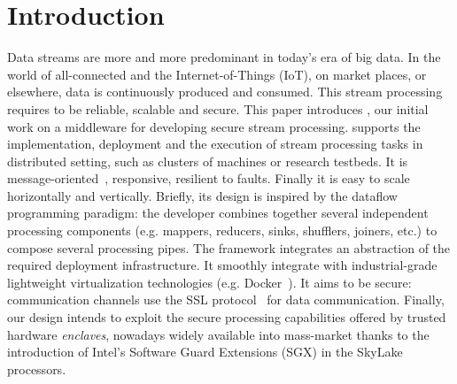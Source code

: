 \section{Introduction}
\label{sec:introduction}


Data streams are more and more predominant in today's era of big data.
In the world of all-connected and the Internet-of-Things (IoT), on market places, or elsewhere, data is continuously produced and consumed.
This stream processing requires to be reliable, scalable and secure.
This paper introduces \SYS, our initial work on a middleware for developing secure stream processing.
\SYS supports the implementation, deployment and the execution of stream processing tasks in distributed setting, such as clusters of machines or research testbeds.
It is message-oriented~\cite{mom}, responsive, resilient to faults.
Finally it is easy to scale horizontally and vertically.
Briefly, its design is inspired by the dataflow programming paradigm\cite{uustalu_essence_2005}: the developer combines together several independent processing components (e.g. mappers, reducers, sinks, shufflers, joiners, etc.) to compose several processing pipes.%
The framework integrates an abstraction of the required deployment infrastructure.
It smoothly integrate with industrial-grade lightweight virtualization technologies (e.g. Docker~\cite{docker}).%
It aims to be secure: communication channels use the SSL protocol~\cite{freier2011secure} for data communication.
Finally, our design intends to exploit the secure processing capabilities offered by trusted hardware \emph{enclaves}, nowadays widely available into mass-market thanks to the introduction of Intel's Software Guard Extensions (SGX)\cite{costan_intel} in the SkyLake processors\cite{skylake}.

